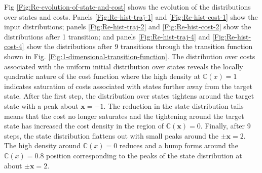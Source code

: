 Fig \ref{Fig:Re-evolution-of-state-and-cost} shows the evolution of the distributions over states and costs. Panels \ref{Fig:Re-hist-traj-1} and \ref{Fig:Re-hist-cost-1} show the input distributions; panels \ref{Fig:Re-hist-traj-2} and \ref{Fig:Re-hist-cost-2} show the distributions after 1 transition; and panels \ref{Fig:Re-hist-traj-4} and \ref{Fig:Re-hist-cost-4} show the distributions after 9 transitions through the transition function shown in Fig. \ref{Fig:1-dimensional-transition-function}. The distribution over costs associated with the uniform initial distribution over states reveals the locally quadratic nature of the cost function where the high density at $\mathbb{C}(x)=1$ indicates saturation of costs associated with states further away from the target state. After the first step, the distribution over states tightens around the target state with a peak about $\mathbf{x}=-1$. The reduction in the state distribution tails means that the cost no longer saturates and the tightening around the target state has increased the cost density in the region of $\mathbb{C}(\mathbf{x})=0$. Finally, after 9 steps, the state distribution flattens out with small peaks around the $\pm\mathbf{x}=2$. The high density around $\mathbb{C}(x)=0$ reduces and a bump forms around the $\mathbb{C}(x)=0.8$ position corresponding to the peaks of the state distribution at about $\pm\mathbf{x}=2$. 

